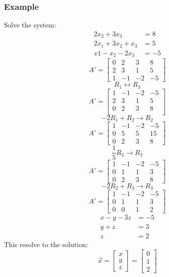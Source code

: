 \documentclass{math}
\begin{document}
\subsubsection*{Example}
Solve the system:
\begin{align*}
  2x_2+3x_3 &= 8 \\
  2x_1+3x_2+x_3 &= 5 \\
  x1-x_2-2x_3 &= -5
\end{align*}
\[ A' = \left[\begin{array}{ccc|c}
  0 & 2 & 3 & 8 \\
  2 & 3 & 1 & 5 \\
  1 & -1 & -2 & -5
\end{array}\right] \]
\[ R_1 \leftrightarrow R_3 \]
\[ A' = \left[\begin{array}{ccc|c}
  1 & -1 & -2 & -5 \\
  2 & 3 & 1 & 5 \\
  0 & 2 & 3 & 8 \\
\end{array}\right] \]
\[ -2R_1+R_2 \to R_2 \]
\[ A' = \left[\begin{array}{ccc|c}
  1 & -1 & -2 & -5 \\
  0 & 5 & 5 & 15 \\
  0 & 2 & 3 & 8
\end{array}\right] \]
\[ \frac{1}{5}R_2 \to R_2 \]
\[ A' = \left[\begin{array}{ccc|c}
  1 & -1 & -2 & -5 \\
  0 & 1 & 1 & 3 \\
  0 & 2 & 3 & 8
\end{array}\right] \]
\[ -2R_2+R_3 \to R_3 \]
\[ A' = \left[\begin{array}{ccc|c}
  1 & -1 & -2 & -5 \\
  0 & 1 & 1 & 3 \\
  0 & 0 & 1 & 2
\end{array}\right] \]
\begin{align*}
  x-y-3z &= -5 \\
  y+z &= 3 \\
  z &= 2
\end{align*}
This resolve to the solution:
\[ \vec{x} = \begin{bmatrix}x \\ y \\ z\end{bmatrix} = \begin{bmatrix}
  0 \\ 1 \\ 2
\end{bmatrix} \]
\end{document}
